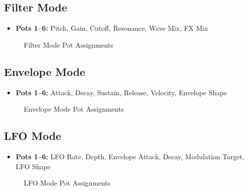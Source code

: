 \subsection{Filter Mode}
\begin{itemize}
    \item \textbf{Pots 1–6:} Pitch, Gain, Cutoff, Resonance, Wave Mix, FX Mix
\end{itemize}
\begin{figure}[H]
    \centering
    
    \caption{Filter Mode Pot Assignments}
\end{figure}

\subsection{Envelope Mode}
\begin{itemize}
    \item \textbf{Pots 1–6:} Attack, Decay, Sustain, Release, Velocity, Envelope Shape
\end{itemize}
\begin{figure}[H]
    \centering
    
    \caption{Envelope Mode Pot Assignments}
\end{figure}

\subsection{LFO Mode}
\begin{itemize}
    \item \textbf{Pots 1–6:} LFO Rate, Depth, Envelope Attack, Decay, Modulation Target, LFO Shape
\end{itemize}
\begin{figure}[H]
    \centering
    
    \caption{LFO Mode Pot Assignments}
\end{figure}

